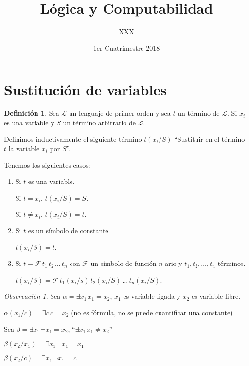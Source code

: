 \documentclass[a4paper,11pt]{article}
\title{Lógica y Computabilidad}
\author{XXX}
\date{1er Cuatrimestre 2018}
\theoremstyle{definition}
\newtheorem{defn}{Definición}[section]
\theoremstyle{remark}
\newtheorem*{remk}{Observación}
\def\LL{\ensuremath{\mathcal{L}}}
\begin{document}
\maketitle

\section{Sustitución de variables}

\begin{defn}
    Sea $\LL$ un lenguaje de primer orden y sea $t$ un término de $\LL$.
    Si $x_i$ es una variable y $S$ un término arbitrario de $\LL$.
    
    Definimos inductivamente el siguiente término $t(x_i/S)$ 
    ``Sustituir en el término $t$ la variable $x_i$ por $S$''.
    
    Tenemos los siguientes casos:
    
    \begin{enumerate}[label=\emph{\alph*})]
        \item Si $t$ es una variable.
        
        Si $t = x_i$, $t(x_i/S) = S$. 
        
        Si $t \neq x_i$, $t(x_i/S) = t$.
        
        \item Si $t$ es un símbolo de constante 
        
        $t(x_i/S) = t$.
        
        \item Si $t = \mathcal F\,t_1\,t_2\,\dots\,t_n$ con $\mathcal F$ un símbolo de 
        función $n$-ario y $t_1, t_2, \dots, t_n$ términos.
        
        $t(x_i/S) = \mathcal F\, t_1(x_i/s)\, t_2(x_i/S)\,\dots\,t_n(x_i/S)$.
    \end{enumerate}
\end{defn}

\begin{remk}
    Sea $\alpha = \exists x_1\, x_1 = x_2$, $x_1$ es variable ligada y $x_2$ es variable libre.
    
    $\alpha(x_1/c) = \exists c\,c=x_2$ (no es fórmula, no se puede cuantificar una constante)
    
    Sea $\beta = \exists x_1\,\lnot x_1 = x_2$, ``$\exists x_1\,x_1 \neq x_2$''
    
    $\beta(x_2/x_1) =  \exists x_1\,\lnot x_1 = x_1$
    
    $\beta(x_2/c) = \exists x_1\,\lnot x_1 = c$
\end{remk}
\end{document}
